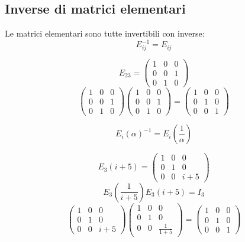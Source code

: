 \documentclass[a4paper]{article}
\theoremstyle{break}
\theoremstyle{break}
\theoremstyle{break}
\theoremstyle{break}
\begin{document}
\subsection{Inverse di matrici elementari}
Le matrici elementari sono tutte invertibili con inverse:
\[
  E_{ij}^{-1} = E_{ij}
\] 
\begin{figure}[H]
  \begin{example}
    \[
      E_{23} = \begin{pmatrix} 
        1 & 0 & 0\\
        0 & 0 & 1\\
        0 & 1 & 0
      \end{pmatrix}
    \] 
    \[
      \begin{pmatrix} 
        1 & 0 & 0\\
        0 & 0 & 1\\
        0 & 1 & 0
      \end{pmatrix} 
      \begin{pmatrix} 
        1 & 0 & 0\\
        0 & 0 & 1\\
        0 & 1 & 0
      \end{pmatrix}
      =
      \begin{pmatrix} 
        1 & 0 & 0\\
        0 & 1 & 0\\
        0 & 0 & 1
      \end{pmatrix}
    \] 
  \end{example}
\end{figure}
\[
  E_i(\alpha)^{-1} = E_i(\frac{1}{\alpha})
\] 
\begin{figure}[H]
  \begin{example}
    \[
      E_3(i+5) = \begin{pmatrix} 
        1 & 0 & 0\\
        0 & 1 & 0\\
        0 & 0 & i+5
      \end{pmatrix}
    \] 
    \[
      E_3(\frac{1}{i+5})E_3(i+5) = I_3
    \]
    \[
      \begin{pmatrix} 
        1 & 0 & 0\\
        0 & 1 & 0\\
        0 & 0 & i+5
      \end{pmatrix}
      \begin{pmatrix} 
        1 & 0 & 0\\
        0 & 1 & 0\\
        0 & 0 & \frac{1}{1+5} 
      \end{pmatrix}
      =
      \begin{pmatrix} 
        1 & 0 & 0\\
        0 & 1 & 0\\
        0 & 0 & 1
      \end{pmatrix}
    \] 
  \end{example}
\end{figure}
\end{document}
